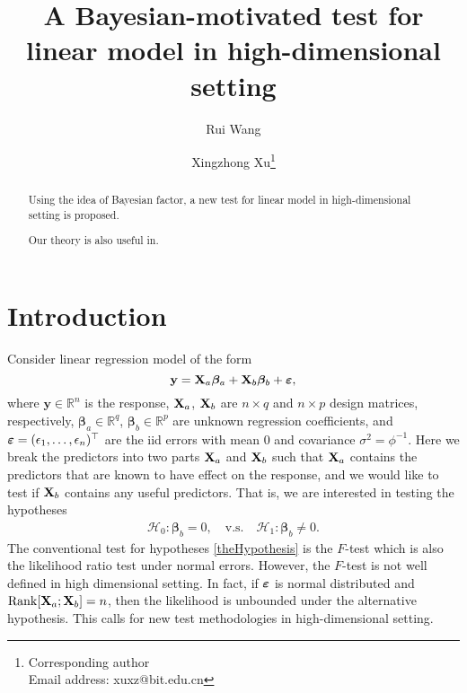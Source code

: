 \documentclass[11pt]{article}
\DeclareMathOperator{\myRank}{Rank}
\newcommand{\By}{\mathbf{y}}    \newcommand{\Bz}{\mathbf{z}}
\newcommand{\bfsym}[1]{\ensuremath{\boldsymbol{#1}}}
\def\bbeta{\bfsym \beta}
\theoremstyle{plain}
\theoremstyle{definition}
\theoremstyle{remark}
\begin{document}
\title{
A Bayesian-motivated test for linear model in high-dimensional setting
}



\author[1]{Rui Wang}
\author[1,2]{Xingzhong Xu\thanks{Corresponding author\\Email address: xuxz@bit.edu.cn}}

\maketitle
\begin{abstract}
    Using the idea of Bayesian factor, a new test for linear model in high-dimensional setting is proposed.

    Our theory is also useful in.
\end{abstract}
\section{Introduction} 
Consider linear regression model of the form
\begin{equation}\label{label:linearModel}
    \By = 
    \BX_a \bbeta_a + \BX_b \bbeta_b + \bepsilon, %
\end{equation}
where $\By \in \mathbb R^n$ is the response, 
$\mathbf{X}_a$, $\mathbf{X}_b$ are $n\times q$ and $n\times p$ design matrices, respectively,  $\bbeta_a\in \mathbb R^q$, $\bbeta_b\in \mathbb R^p$ are unknown regression coefficients, and $\bepsilon=(\epsilon_1,\ldots,\epsilon_n)^\top$ are the iid errors with mean $0$ and covariance $\sigma^2=\phi^{-1}$.
Here we break the predictors into two parts $\mathbf{X}_a$ and $\mathbf{X}_b$ such that $\mathbf{X}_a$ contains the predictors that are known to have effect on the response,
and we would like to test if $\mathbf{X}_b$ contains any useful predictors.
That is, we are interested in testing the hypotheses
\begin{align}\label{theHypothesis}
    \mathcal H_0:   \bbeta_b =0,\quad
    \text{v.s.} \quad
    \mathcal H_1:   \bbeta_b \neq 0.
\end{align}
The conventional test for hypotheses \eqref{theHypothesis} is the $F$-test which is also the likelihood ratio test under normal errors.
However, the $F$-test is not well defined in high dimensional setting.
In fact, if $\bepsilon$ is normal distributed and $\myRank[\BX_a;\BX_b]=n$, then the likelihood is unbounded under the alternative hypothesis.
This calls for new test methodologies in high-dimensional setting.
\end{document}

